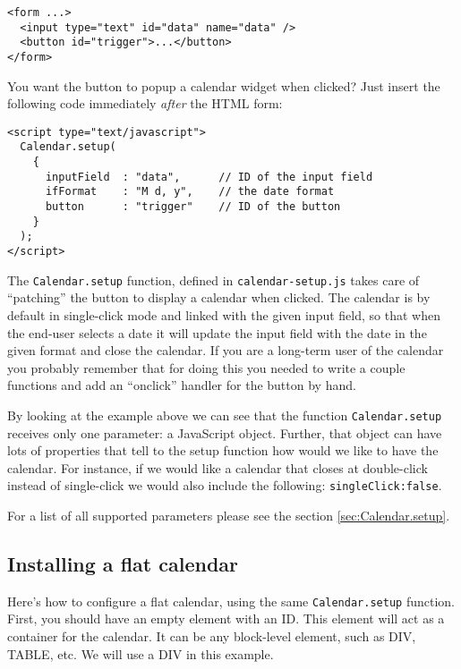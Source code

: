 \documentclass[a4paper,10pt]{article}
\begin{document}
\begin{verbatim}
<form ...>
  <input type="text" id="data" name="data" />
  <button id="trigger">...</button>
</form>
\end{verbatim}

\noindent You want the button to popup a calendar widget when clicked?  Just
insert the following code immediately \emph{after} the HTML form:

\begin{verbatim}
<script type="text/javascript">
  Calendar.setup(
    {
      inputField  : "data",      // ID of the input field
      ifFormat    : "M d, y",    // the date format
      button      : "trigger"    // ID of the button
    }
  );
</script>
\end{verbatim}

The \texttt{Calendar.setup} function, defined in \texttt{calendar-setup.js}
takes care of ``patching'' the button to display a calendar when clicked.  The
calendar is by default in single-click mode and linked with the given input
field, so that when the end-user selects a date it will update the input field
with the date in the given format and close the calendar.  If you are a
long-term user of the calendar you probably remember that for doing this you
needed to write a couple functions and add an ``onclick'' handler for the
button by hand.

By looking at the example above we can see that the function
\texttt{Calendar.setup} receives only one parameter: a JavaScript object.
Further, that object can have lots of properties that tell to the setup
function how would we like to have the calendar.  For instance, if we would
like a calendar that closes at double-click instead of single-click we would
also include the following: \texttt{singleClick:false}.

For a list of all supported parameters please see the section
\ref{sec:Calendar.setup}.

\subsection{Installing a flat calendar}\label{sec:quick-start-flat}

Here's how to configure a flat calendar, using the same \texttt{Calendar.setup}
function.  First, you should have an empty element with an ID.  This element
will act as a container for the calendar.  It can be any block-level element,
such as DIV, TABLE, etc.  We will use a DIV in this example.
\end{document}
